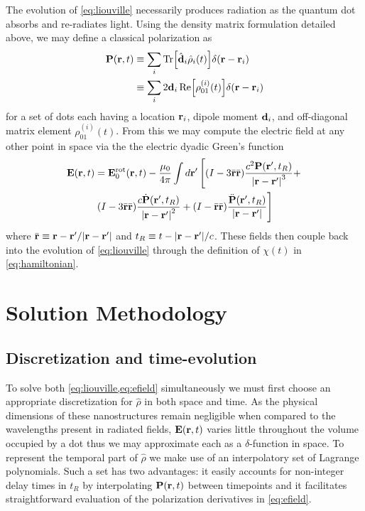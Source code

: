 \documentclass[conference]{IEEEtran}
\begin{document}
The evolution of \cref{eq:liouville} necessarily produces radiation as the quantum dot absorbs and re-radiates light.
Using the density matrix formulation detailed above, we may define a classical polarization as
\begin{equation}
  \begin{aligned}
    \vb{P}(\vb{r}, t) &\equiv \sum_i \Tr[\hat{\vb{d}}_i \hat{\rho}_i(t)] \delta(\vb{r} - \vb{r}_i) \\
                      &\equiv \sum_i 2 \vb{d}_i \Re\!\qty[\rho_{01}^{(i)}(t)] \delta(\vb{r} - \vb{r}_i)
  \end{aligned}
  \label{eq:polarization}
\end{equation}
for a set of dots each having a location $\vb{r}_i$, dipole moment $\vb{d}_i$, and off-diagonal matrix element $\rho_{01}^{(i)}(t)$.
From this we may compute the electric field at any other point in space via the the electric dyadic Green's function\cite{Rothwell2008}
\begin{equation}
  \begin{gathered}
    \vb{E}(\vb{r}, t) = \vb{E}_0^\text{rot}(\vb{r}, t) - \frac{\mu_0}{4\pi} \int d{\vb{r}'} \left [ 
      \qty(I - 3\bar{\vb{r}}\bar{\vb{r}}) \frac{c^2 \vb{P}(\vb{r}', t_R)}{\abs{\vb{r} - \vb{r}'}^3} + \right . \\
      \left . \qty(I - 3\bar{\vb{r}}\bar{\vb{r}}) \frac{c \dot{\vb{P}}(\vb{r}', t_R)}{\abs{\vb{r} - \vb{r}'}^2} +
      \qty(I -  \bar{\vb{r}}\bar{\vb{r}}) \frac{\ddot{\vb{P}}(\vb{r}', t_R)}{\abs{\vb{r} - \vb{r}'}} \right ] 
  \end{gathered}
  \label{eq:efield}
\end{equation}
where $\bar{\vb{r}} \equiv \vb{r} - \vb{r}'/\abs{\vb{r} - \vb{r}'}$ and $t_R \equiv t - \abs{\vb{r} - \vb{r}'}/c$.
These fields then couple back into the evolution of \cref{eq:liouville} through the definition of $\chi(t)$ in \cref{eq:hamiltonian}.

\section{Solution Methodology}
\subsection{Discretization and time-evolution}

To solve both \cref{eq:liouville,eq:efield} simultaneously we must first choose an appropriate discretization for $\hat{\rho}$ in both space and time.
As the physical dimensions of these nanostructures remain negligible when compared to the wavelengths present in radiated fields, $\vb{E}(\vb{r}, t)$ varies little throughout the volume occupied by a dot thus we may approximate each as a $\delta$-function in space.
To represent the temporal part of $\hat{\rho}$ we make use of an interpolatory set of Lagrange polynomials.
Such a set has two advantages: it easily accounts for non-integer delay times in $t_R$ by interpolating $\vb{P}(\vb{r}, t)$ between timepoints and it facilitates straightforward evaluation of the polarization derivatives in \cref{eq:efield}.
\end{document}
